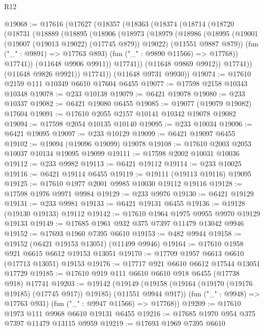 \begin{lexlean}{R12}
\begin{coremodule}
@19068 := @17616
    (@17627
      (@18357
        (@18363
          (@18374
            (@18714
              (@18720
                (@18731
                  (@18889
                    (@18895
                      (@18906
                        (@18973
                          (@18979
                            (@18986
                              (@18995
                                (@19001 (@19007 (@19013 @19022) (@17745 @879)) @19022)
                                (@11551 @9887 @879))
                              (fun ("_" : @9891) => @17763 @893)
                              (fun ("_" : @9890 @11566) => @17768))
                            @17741))
                        (@11648 @9906 @9911))
                      @17741))
                  (@11648 @9869 @9912))
                @17741))
            (@11648 @9826 @9921))
          @17741))
      (@11648 @9731 @9930))
@19074 := @17610 @2159 @111 @10349 @6610 @17604 @6455
@19077 := @17598 @2158 @10343 @10348
@19078 := @233 @10138
@19079 := @6421 @19078
@19080 := @233 @10337
@19082 := @6421 @19080 @6455
@19085 := @19077 (@19079 @19082) @17604
@19091 := @17610 @2055 @2157 @10141 @10342 @19078 @19082
@19094 := @17598 @2054 @10135 @10140
@19095 := @233 @10034
@19096 := @6421 @19095
@19097 := @233 @10129
@19099 := @6421 @19097 @6455
@19102 := @19094 (@19096 @19099) @19078
@19108 := @17610 @2003 @2053 @10037 @10134 @19095 @19099
@19111 := @17598 @2002 @10031 @10036
@19112 := @233 @9982
@19113 := @6421 @19112
@19114 := @233 @10025
@19116 := @6421 @19114 @6455
@19119 := @19111 (@19113 @19116) @19095
@19125 := @17610 @1977 @2001 @9985 @10030 @19112 @19116
@19128 := @17598 @1976 @9971 @9984
@19129 := @233 @9976
@19130 := @6421 @19129
@19131 := @233 @9981
@19133 := @6421 @19131 @6455
@19136 := @19128 (@19130 @19133) @19112
@19142 := @17610 @1964 @1975 @9955 @9970 @19129 @19133
@19149 := @17685 @1961 @932 @375 @7397 @11479 @13042 @9946
@19152 := @17693 @1960 @7395 @6610
@19153 := @482 @9944
@19158 := @19152 (@6421 @19153 @13051) (@11499 @9946)
@19164 := @17610 @1958 @921 @6615 @6612 @19153 @13051
@19170 := @17709 @1957 @6613 @6610 (@17713 @13051) @19153
@19176 := @17717 @921 @6610 @6612 @17544 @13051 @17729
@19185 := @17610 @919 @111 @6610 @6610 @918 @6455 (@17738 @918) @17741
@19203 := @19142
    (@19149
      (@19158 (@19164 (@19170 (@19176 @19185) (@17745 @917)) @19185) (@11551 @9944 @917))
      (fun ("_" : @9948) => @17763 @931)
      (fun ("_" : @9947 @11566) => @17768))
@19209 := @17610 @1973 @111 @9968 @6610 @19131 @6455
@19216 := @17685 @1970 @954 @375 @7397 @11479 @13115 @9959
@19219 := @17693 @1969 @7395 @6610

\end{coremodule}
\end{lexlean}
